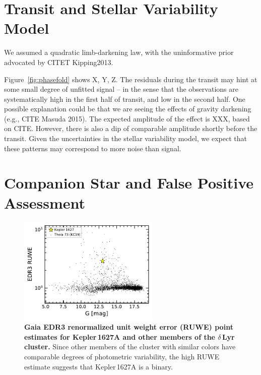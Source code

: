 \documentclass[12pt,modern,tighten]{aastex63}
\begin{document}
\section{Transit and Stellar Variability Model}
\label{app:gptransit}

We assumed a quadratic limb-darkening law, with the uninformative prior
advocated by CITET Kipping2013.


Figure~\ref{fig:phasefold} shows X, Y, Z.  The residuals during the
transit may hint at some small degree of unfitted signal -- in the
sense that the observations are systematically high in the first half
of transit, and low in the second half.  
One possible explanation could be that we are seeing the effects of
gravity darkening (e.g., CITE Masuda 2015).
The expected amplitude of the effect is XXX, based on CITE.
However, there is also a dip of comparable amplitude shortly before
the transit. 
Given the uncertainties in the stellar variability model, we expect
that these patterns may correspond to more noise than signal.

\section{Companion Star and False Positive Assessment}
\label{app:companionstar}

\begin{figure}[t]
	\begin{center}
		\leavevmode
		\includegraphics[width=0.6\textwidth]{f6.pdf}
	\end{center}
	\vspace{-0.7cm}
	\caption{
    {\bf Gaia EDR3 renormalized unit weight error (RUWE) point
    estimates for Kepler\,1627A and other members of
    the $\delta$\,Lyr cluster.}  Since other members of the cluster
    with similar colors have comparable degrees of photometric
    variability, the high RUWE estimate suggests that Kepler\,1627A is
    a binary. 
		\label{fig:ruwe}
	}
\end{figure}
\end{document}
